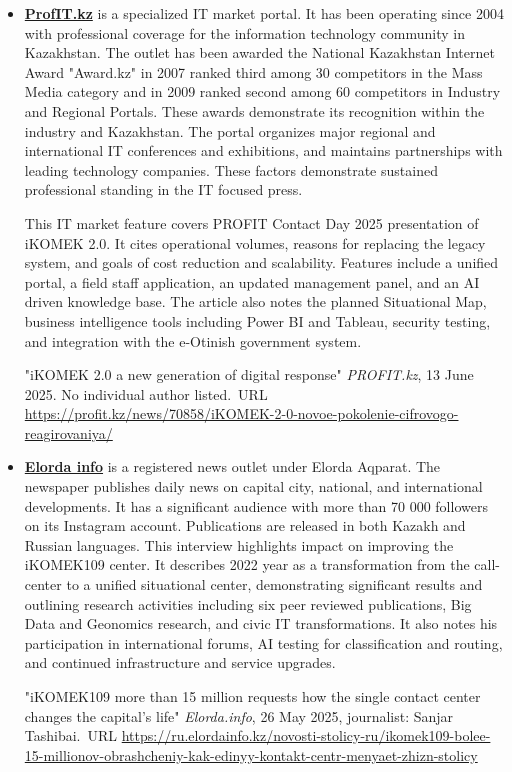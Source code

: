 \begin{itemize}
\item \textbf{\underline{ProfIT.kz}} is a specialized IT market portal. It has been operating since 2004 with professional coverage for the information technology community in Kazakhstan. The outlet has been awarded the National Kazakhstan Internet Award "Award.kz" in 2007 ranked third among 30 competitors in the Mass Media category and in 2009 ranked second among 60 competitors in Industry and Regional Portals. These awards demonstrate its recognition within the industry and Kazakhstan. The portal organizes major regional and international IT conferences and exhibitions, and maintains partnerships with leading technology companies. These factors demonstrate sustained professional standing in the IT focused press.


This IT market feature covers \mrls PROFIT Contact Day 2025 presentation of iKOMEK 2.0. It cites operational volumes, reasons for replacing the legacy system, and goals of cost reduction and scalability. Features include a unified portal, a field staff application, an updated management panel, and an AI driven knowledge base. The article also notes the planned Situational Map, business intelligence tools including Power BI and Tableau, security testing, and integration with the e-Otinish government system.


"iKOMEK 2.0 a new generation of digital response" \emph{PROFIT.kz}, 13 June 2025. No individual author listed.\
URL \url{https://profit.kz/news/70858/iKOMEK-2-0-novoe-pokolenie-cifrovogo-reagirovaniya/}
\ExhibitList{ProfitContactDay2025, ProfitLeader}


\item \textbf{\underline{Elorda info}} is a registered news outlet under Elorda Aqparat. The newspaper publishes daily news on capital city, national, and international developments. It has a significant audience with more than 70 000 followers on its Instagram account. Publications are released in both Kazakh and Russian languages.
This interview highlights \mrls impact on improving the iKOMEK109 center. It describes 2022 year as a transformation from the call-center to a unified situational center, demonstrating significant results and outlining \mrls research activities including six peer reviewed publications, Big Data and Geonomics research, and civic IT transformations. It also notes his participation in international forums, AI testing for classification and routing, and continued infrastructure and service upgrades.


"iKOMEK109 more than 15 million requests how the single contact center changes the capital's life" \emph{Elorda.info}, 26 May 2025, journalist: Sanjar Tashibai.\
URL \url{https://ru.elordainfo.kz/novosti-stolicy-ru/ikomek109-bolee-15-millionov-obrashcheniy-kak-edinyy-kontakt-centr-menyaet-zhizn-stolicy}






\end{itemize}
